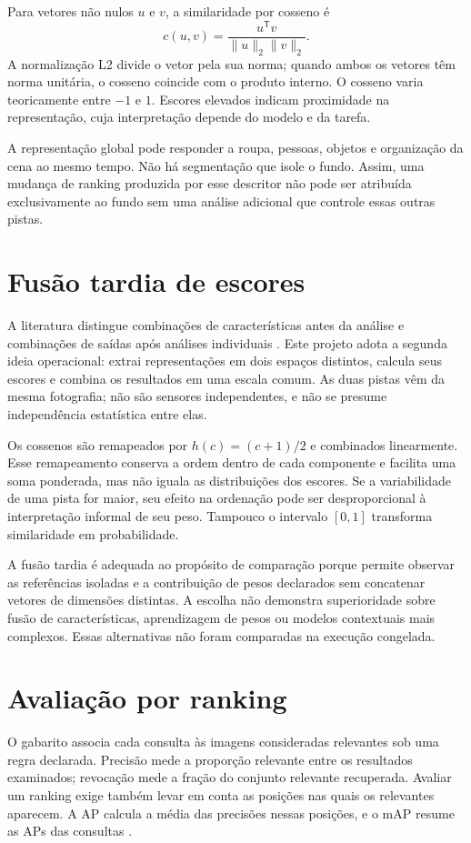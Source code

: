 Para vetores não nulos $u$ e $v$, a similaridade por cosseno é
\begin{equation}\label{eq:cosseno}
 c(u,v)=\frac{u^{\mathsf T}v}{\lVert u\rVert_2\lVert v\rVert_2}.
\end{equation}
A normalização L2 divide o vetor pela sua norma; quando ambos os vetores têm norma unitária, o cosseno coincide com o produto interno. O cosseno varia teoricamente entre $-1$ e $1$. Escores elevados indicam proximidade na representação, cuja interpretação depende do modelo e da tarefa.

A representação global pode responder a roupa, pessoas, objetos e organização da cena ao mesmo tempo. Não há segmentação que isole o fundo. Assim, uma mudança de ranking produzida por esse descritor não pode ser atribuída exclusivamente ao fundo sem uma análise adicional que controle essas outras pistas.

\section{Fusão tardia de escores}
A literatura distingue combinações de características antes da análise e combinações de saídas após análises individuais \cite{Atrey2010}. Este projeto adota a segunda ideia operacional: extrai representações em dois espaços distintos, calcula seus escores e combina os resultados em uma escala comum. As duas pistas vêm da mesma fotografia; não são sensores independentes, e não se presume independência estatística entre elas.

Os cossenos são remapeados por $h(c)=(c+1)/2$ e combinados linearmente. Esse remapeamento conserva a ordem dentro de cada componente e facilita uma soma ponderada, mas não iguala as distribuições dos escores. Se a variabilidade de uma pista for maior, seu efeito na ordenação pode ser desproporcional à interpretação informal de seu peso. Tampouco o intervalo $[0,1]$ transforma similaridade em probabilidade.

A fusão tardia é adequada ao propósito de comparação porque permite observar as referências isoladas e a contribuição de pesos declarados sem concatenar vetores de dimensões distintas. A escolha não demonstra superioridade sobre fusão de características, aprendizagem de pesos ou modelos contextuais mais complexos. Essas alternativas não foram comparadas na execução congelada.

\section{Avaliação por ranking}
O gabarito associa cada consulta às imagens consideradas relevantes sob uma regra declarada. Precisão mede a proporção relevante entre os resultados examinados; revocação mede a fração do conjunto relevante recuperada. Avaliar um ranking exige também levar em conta as posições nas quais os relevantes aparecem. A AP calcula a média das precisões nessas posições, e o mAP resume as APs das consultas \cite{Manning2008}.

